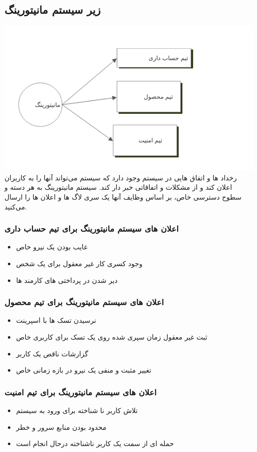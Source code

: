 \subsection{زیر سیستم مانیتورینگ}
\includegraphics[scale=0.8]{assets/monitoring_dfd.png}
رخداد ها و اتفاق هایی در سیستم وجود دارد که سیستم می‌تواند آنها را به کاربران اعلان کند و از مشکلات و اتفاقاتی خبر دار کند.
سیستم مانیتورینگ به هر دسته و سطوح دسترسی خاص، بر اساس وظایف آنها یک سری لاگ ها و اعلان ها را ارسال می‌کنید.

\subsubsection{اعلان های سیستم مانیتورینگ برای تیم حساب داری}
\begin{itemize}
	\item غایب بودن یک نیرو خاص
	\item وجود کسری کار غیر معقول برای یک شخص
	\item دیر شدن در پرداختی های کارمند ها 
\end{itemize}

\subsubsection{اعلان های سیستم مانیتورینگ برای تیم محصول}
\begin{itemize}
	\item نرسیدن تسک ها با اسپرینت
	\item ثبت غیر معقول زمان سپری شده روی یک تسک برای کاربری خاص
	\item گزارشات ناقص یک کاربر
	\item تغییر مثبت و منفی یک نیرو در بازه زمانی خاص
\end{itemize}

\subsubsection{اعلان های سیستم مانیتورینگ برای تیم امنیت}
\begin{itemize}
	\item تلاش کاربر نا شناخته برای ورود به سیستم
	\item محدود بودن منابع سرور و خطر
	\item حمله ای از سمت یک کاربر ناشناخته درحال انجام است
\end{itemize}
